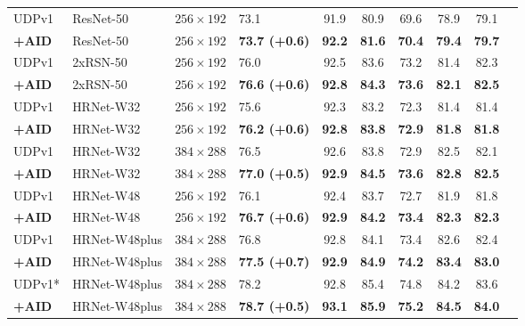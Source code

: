 \documentclass[final]{cvpr}
\begin{document}
\begin{table*}
\begin{center}
\begin{tabular}{l|l|c|lcccccc}
\hline
UDPv1 \cite{UDP}                  & ResNet-50     &$256\times192$    &73.1                  & 91.9              & 80.9         & 69.6          &78.9           &79.1\\
\textbf{+AID}                     & ResNet-50     &$256\times192$    &\textbf{73.7 (+0.6)}   &\textbf{92.2}      &\textbf{81.6} &\textbf{70.4}  &\textbf{79.4}  &\textbf{79.7}\\
UDPv1 \cite{UDP}                   & 2xRSN-50      &$256\times192$    &76.0                  & 92.5              & 83.6         & 73.2          &81.4           &82.3\\
\textbf{+AID}                     & 2xRSN-50      &$256\times192$    &\textbf{76.6 (+0.6)}   &\textbf{92.8}      &\textbf{84.3} &\textbf{73.6}  &\textbf{82.1}  &\textbf{82.5}\\
UDPv1 \cite{UDP}                  & HRNet-W32     &$256\times192$    &75.6                  & 92.3             & 83.2          & 72.3          &81.4           &81.4\\
\textbf{+AID}                     & HRNet-W32     &$256\times192$    &\textbf{76.2 (+0.6)}   & \textbf{92.8}    &\textbf{83.8}  & \textbf{72.9} &\textbf{81.8}  &\textbf{81.8}\\
UDPv1 \cite{UDP}                  & HRNet-W32     &$384\times288$    &76.5                  & 92.6             & 83.8          & 72.9          &82.5           &82.1\\
\textbf{+AID}                     & HRNet-W32     &$384\times288$    &\textbf{77.0 (+0.5)}   &\textbf{92.9}     & \textbf{84.5} & \textbf{73.6} &\textbf{82.8}  &\textbf{82.5}\\
UDPv1 \cite{UDP}                  & HRNet-W48     &$256\times192$    &76.1                  & 92.4             & 83.7          & 72.7          &81.9           &81.8\\
\textbf{+AID}                     & HRNet-W48     &$256\times192$    &\textbf{76.7 (+0.6)}   & \textbf{92.9}    & \textbf{84.2} &\textbf{73.4}  &\textbf{82.3}  &\textbf{82.3}\\
UDPv1 \cite{UDP}                  & HRNet-W48plus &$384\times288$    &76.8                  & 92.8             & 84.1          & 73.4          &82.6           &82.4\\
\textbf{+AID}                     & HRNet-W48plus &$384\times288$    &\textbf{77.5 (+0.7)}   & \textbf{92.9}    & \textbf{84.9} & \textbf{74.2} &\textbf{83.4}  &\textbf{83.0}\\
UDPv1* \cite{UDP}                 & HRNet-W48plus &$384\times288$    &78.2                  & 92.8             & 85.4          & 74.8          &84.2           &83.6\\
\textbf{+AID}              & HRNet-W48plus &$384\times288$    &\textbf{78.7 (+0.5)}   & \textbf{93.1}    & \textbf{85.9} & \textbf{75.2} &\textbf{84.5}  &\textbf{84.0}\\



\end{tabular}
\end{center}
\end{table*}
\end{document}
